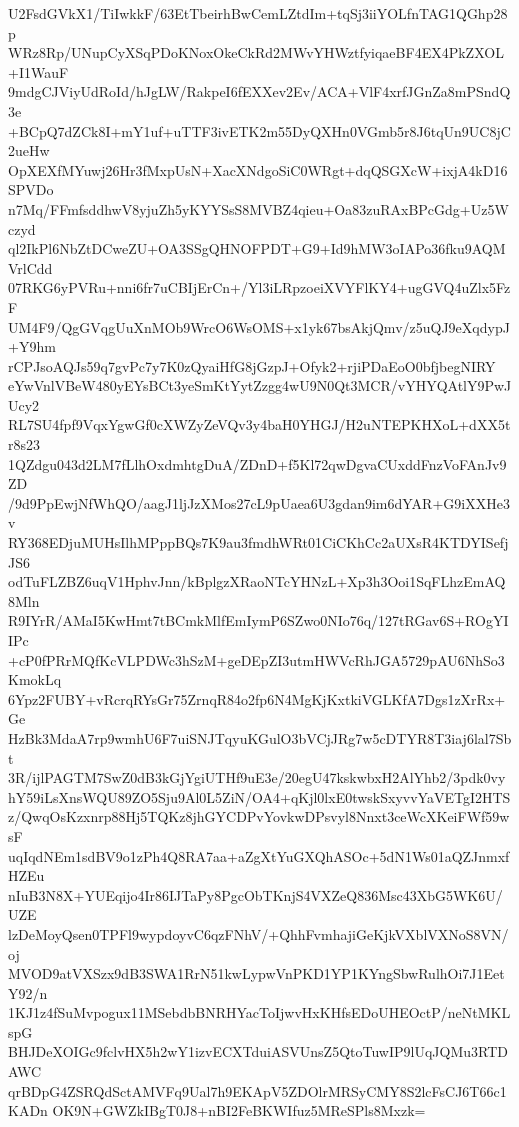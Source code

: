 U2FsdGVkX1/TiIwkkF/63EtTbeirhBwCemLZtdIm+tqSj3iiYOLfnTAG1QGhp28p
WRz8Rp/UNupCyXSqPDoKNoxOkeCkRd2MWvYHWztfyiqaeBF4EX4PkZXOL+I1WauF
9mdgCJViyUdRoId/hJgLW/RakpeI6fEXXev2Ev/ACA+VlF4xrfJGnZa8mPSndQ3e
+BCpQ7dZCk8I+mY1uf+uTTF3ivETK2m55DyQXHn0VGmb5r8J6tqUn9UC8jC2ueHw
OpXEXfMYuwj26Hr3fMxpUsN+XacXNdgoSiC0WRgt+dqQSGXcW+ixjA4kD16SPVDo
n7Mq/FFmfsddhwV8yjuZh5yKYYSsS8MVBZ4qieu+Oa83zuRAxBPcGdg+Uz5Wczyd
ql2IkPl6NbZtDCweZU+OA3SSgQHNOFPDT+G9+Id9hMW3oIAPo36fku9AQMVrlCdd
07RKG6yPVRu+nni6fr7uCBIjErCn+/Yl3iLRpzoeiXVYFlKY4+ugGVQ4uZlx5FzF
UM4F9/QgGVqgUuXnMOb9WrcO6WsOMS+x1yk67bsAkjQmv/z5uQJ9eXqdypJ+Y9hm
rCPJsoAQJs59q7gvPc7y7K0zQyaiHfG8jGzpJ+Ofyk2+rjiPDaEoO0bfjbegNIRY
eYwVnlVBeW480yEYsBCt3yeSmKtYytZzgg4wU9N0Qt3MCR/vYHYQAtlY9PwJUcy2
RL7SU4fpf9VqxYgwGf0cXWZyZeVQv3y4baH0YHGJ/H2uNTEPKHXoL+dXX5tr8s23
1QZdgu043d2LM7fLlhOxdmhtgDuA/ZDnD+f5Kl72qwDgvaCUxddFnzVoFAnJv9ZD
/9d9PpEwjNfWhQO/aagJ1ljJzXMos27cL9pUaea6U3gdan9im6dYAR+G9iXXHe3v
RY368EDjuMUHsIlhMPppBQs7K9au3fmdhWRt01CiCKhCc2aUXsR4KTDYISefjJS6
odTuFLZBZ6uqV1HphvJnn/kBplgzXRaoNTcYHNzL+Xp3h3Ooi1SqFLhzEmAQ8Mln
R9IYrR/AMaI5KwHmt7tBCmkMlfEmIymP6SZwo0NIo76q/127tRGav6S+ROgYIIPc
+cP0fPRrMQfKcVLPDWc3hSzM+geDEpZI3utmHWVcRhJGA5729pAU6NhSo3KmokLq
6Ypz2FUBY+vRcrqRYsGr75ZrnqR84o2fp6N4MgKjKxtkiVGLKfA7Dgs1zXrRx+Ge
HzBk3MdaA7rp9wmhU6F7uiSNJTqyuKGulO3bVCjJRg7w5cDTYR8T3iaj6lal7Sbt
3R/ijlPAGTM7SwZ0dB3kGjYgiUTHf9uE3e/20egU47kskwbxH2AlYhb2/3pdk0vy
hY59iLsXnsWQU89ZO5Sju9Al0L5ZiN/OA4+qKjl0lxE0twskSxyvvYaVETgI2HTS
z/QwqOsKzxnrp88Hj5TQKz8jhGYCDPvYovkwDPsvyl8Nnxt3ceWcXKeiFWf59wsF
uqIqdNEm1sdBV9o1zPh4Q8RA7aa+aZgXtYuGXQhASOc+5dN1Ws01aQZJnmxfHZEu
nIuB3N8X+YUEqijo4Ir86IJTaPy8PgcObTKnjS4VXZeQ836Msc43XbG5WK6U/UZE
lzDeMoyQsen0TPFl9wypdoyvC6qzFNhV/+QhhFvmhajiGeKjkVXblVXNoS8VN/oj
MVOD9atVXSzx9dB3SWA1RrN51kwLypwVnPKD1YP1KYngSbwRulhOi7J1EetY92/n
1KJ1z4fSuMvpogux11MSebdbBNRHYacToIjwvHxKHfsEDoUHEOctP/neNtMKLspG
BHJDeXOIGc9fclvHX5h2wY1izvECXTduiASVUnsZ5QtoTuwIP9lUqJQMu3RTDAWC
qrBDpG4ZSRQdSctAMVFq9Ual7h9EKApV5ZDOlrMRSyCMY8S2lcFsCJ6T66c1KADn
OK9N+GWZkIBgT0J8+nBI2FeBKWIfuz5MReSPls8Mxzk=
